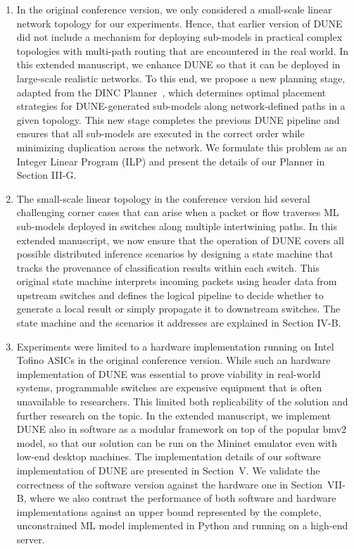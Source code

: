 \documentclass[onecolumn,letter,10pt]{article}
\begin{document}
\begin{enumerate}
   
    \item In the original conference version, we only considered a small-scale linear network topology for our experiments.
    Hence, that earlier version of DUNE did not include a mechanism for deploying sub-models in practical complex topologies with multi-path routing that are encountered in the real world. In this extended manuscript, we enhance DUNE so that it can be deployed in large-scale realistic networks. To this end, we propose a new planning stage, adapted from the DINC Planner~\cite{dinc-conext23}, which determines optimal placement strategies for DUNE-generated sub-models along network-defined paths in a given topology. This new stage completes the previous DUNE pipeline and ensures that all sub-models are executed in the correct order while minimizing duplication across the network. We formulate this problem as an Integer Linear Program (ILP) and present the details of our Planner in Section III-G.
    
    \item The small-scale linear topology in the conference version hid several challenging corner cases that can arise when a packet or flow traverses ML sub-models deployed in switches along multiple intertwining paths. In this extended manuscript, we now ensure that the operation of DUNE covers all possible distributed inference scenarios by designing a state machine that tracks the provenance of classification results within each switch. This original state machine interprets incoming packets using header data from upstream switches and defines the logical pipeline to decide whether to generate a local result or simply propagate it to downstream switches. The state machine and the scenarios it addresses are explained in Section IV-B.
    
    \item Experiments were limited to a hardware implementation running on Intel Tofino ASICs in the original conference version. While such an hardware  implementation of DUNE was essential to prove viability in real-world systems, programmable switches are expensive equipment that is often unavailable to researchers. This limited both replicability of the solution and further research on the topic. In the extended manuscript, we implement DUNE also in software as a modular framework on top of the popular bmv2 model, so that our solution can be run on the Mininet emulator even with low-end desktop machines. The implementation details of our software implementation of DUNE are presented in Section~V. We validate the correctness of the software version against the hardware one in Section~VII-B, where we also contrast the performance of both software and hardware implementations against an upper bound represented by the complete, unconstrained ML model implemented in Python and running on a high-end server.
    

\end{enumerate}
\end{document}

